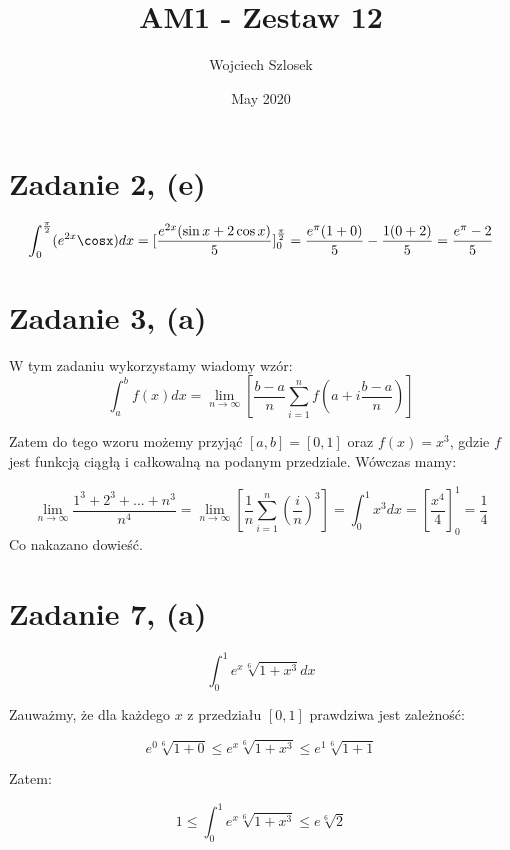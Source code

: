 \documentclass{article}
\title{AM1 - Zestaw 12}
\author{Wojciech Szlosek}
\date{May 2020}
\begin{document}
\maketitle

\section{Zadanie 2, (e)}

$$\int_{0}^{\frac{\pi}{2}} (e^{2x} \cosx) dx = [\frac{e^{2x}(\sin x+2\cos x)}{5}]^{\frac{\pi}{2}}_{0} = \frac{e^{\pi}(1+0)}{5} - \frac{1(0+2)}{5} = \frac{e^{\pi}-2}{5}$$

\section{Zadanie 3, (a)}

W tym zadaniu wykorzystamy wiadomy wzór: $$\int_{a}^{b} f(x) dx = \lim_{n \to \infty}[\frac{b-a}{n} \sum_{i=1}^{n} f(a+i\frac{b-a}{n})] $$

Zatem do tego wzoru możemy przyjąć $[a,b]=[0,1]$ oraz $f(x) = x^3$, gdzie $f$ jest funkcją ciągłą i całkowalną na podanym przedziale. Wówczas mamy:

$$ \lim_{n \to \infty} \frac{1^3 + 2^3 +...+ n^3}{n^4} = \lim_{n \to \infty} [\frac{1}{n} \sum_{i=1}^{n} (\frac{i}{n})^3] = \int_{0}^{1} x^3 dx = [\frac{x^4}{4}]_{0}^{1} = \frac{1}{4}$$
Co nakazano dowieść.

\section{Zadanie 7, (a)}

$$\int_{0}^{1} e^{x} \sqrt[6]{1+x^3} dx$$

Zauważmy, że dla każdego $x$ z przedziału $[0,1]$ prawdziwa jest zależność:

$$e^0 \sqrt[6]{1+0} \leq e^x \sqrt[6]{1+x^3} \leq e^1 \sqrt[6]{1+1}$$

Zatem:

$$1 \leq \int_{0}^{1} e^x \sqrt[6]{1+x^3} \leq e \sqrt[6]{2}$$
\end{document}
